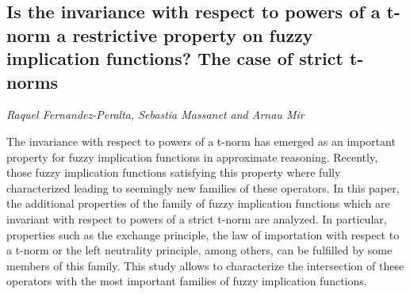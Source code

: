 \documentclass[../booklet.tex]{subfiles}
\begin{document}
\subsection[Is the invariance with respect to powers of a t-norm a restrictive property on fuzzy implication functions? The case of strict t-norms. {\it Raquel Fernandez-Peralta, Sebastia Massanet and Arnau Mir}]{Is the invariance with respect to powers of a t-norm a restrictive property on fuzzy implication functions? The case of strict t-norms}
  

\begin{center}
  {\it Raquel Fernandez-Peralta, Sebastia Massanet and Arnau Mir}
\end{center}

\vskip 0.8cm


The invariance with respect to powers of a t-norm has emerged as an important property for fuzzy implication functions in approximate reasoning. Recently, those fuzzy implication functions satisfying this property where fully characterized leading to seemingly new families of these operators. In this paper, the additional properties of the family of fuzzy implication functions which are invariant with respect to powers of a strict t-norm are analyzed. In particular, properties such as the exchange principle, the law of importation with respect to a t-norm or the left neutrality principle, among others, can be fulfilled by some members of this family. This study allows to characterize the intersection of these operators with the most important families of fuzzy implication functions.  

\end{document}
